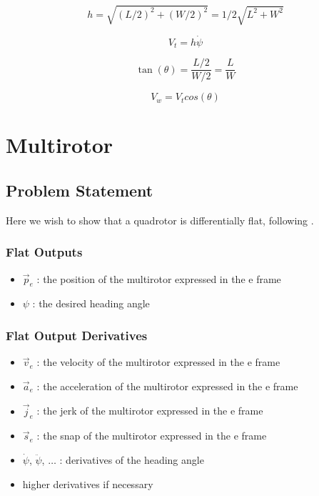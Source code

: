 \documentclass[10pt]{book}
\begin{document}
$$h = \sqrt{(L/2)^2 + (W/2)^2} = 1/2 \sqrt{L^2 + W^2}$$

$$V_t = h \dot{\psi}$$

$$\tan(\theta) = \frac{L/2}{W/2} = \frac{L}{W}$$

$$V_w = V_t cos(\theta)$$

\clearpage
\section{Multirotor}


\subsection{Problem Statement}

Here we wish to show that a quadrotor is differentially flat, following \cite{mellinger2012}.

\subsubsection*{Flat Outputs}
\begin{itemize}
    \item $\vec{p}_e$ : the position of the multirotor expressed in the e frame
    \item $\psi$ : the desired heading angle

\end{itemize}

\subsubsection*{Flat Output Derivatives}
\begin{itemize}
    \item $\vec{v}_e$ : the velocity of the multirotor expressed in the e frame
    \item $\vec{a}_e$ : the acceleration of the multirotor expressed in the e frame
    \item $\vec{j}_e$ : the jerk of the multirotor expressed in the e frame
    \item $\vec{s}_e$ : the snap of the multirotor expressed in the e frame
    \item $\dot{\psi}$, $\ddot{\psi}$, $\ldots{}$ : derivatives of the heading angle
    \item higher derivatives if necessary
\end{itemize}
\end{document}
